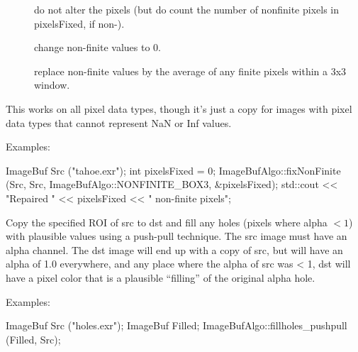 \begin{description} 
\item[\spc] \spc
\item[\rm {}]   do not alter the pixels (but do count the number
                       of nonfinite pixels in {\cf *pixelsFixed}, if non-\NULL).
\item[\rm {}]  change non-finite values to 0.
\item[\rm {}]   replace non-finite values by the average of any
                     finite pixels within a 3x3 window.
\end{description}

This works on all pixel data types, though it's just a copy for images with
pixel data types that cannot represent {\cf NaN} or {\cf Inf} values.


\smallskip
\noindent Examples:
\begin{code}
    ImageBuf Src ("tahoe.exr");
    int pixelsFixed = 0;
    ImageBufAlgo::fixNonFinite (Src, Src, ImageBufAlgo::NONFINITE_BOX3,
                                &pixelsFixed);
    std::cout << "Repaired " << pixelsFixed << " non-finite pixels\n";
\end{code}
\apiend


 
Copy the specified ROI of {\cf src} to {\cf dst} and fill any 
holes (pixels where alpha $< 1$) with plausible values using a push-pull
technique.  The {\cf src} image must have
an alpha channel.  The dst image will end up with a copy of src, but
will have an alpha of 1.0 everywhere, and any place where the alpha
of src was < 1, dst will have a pixel color that is a plausible
``filling'' of the original alpha hole.

\smallskip
\noindent Examples:
\begin{code}
    ImageBuf Src ("holes.exr");
    ImageBuf Filled;
    ImageBufAlgo::fillholes_pushpull (Filled, Src);
\end{code}
\apiend


 

